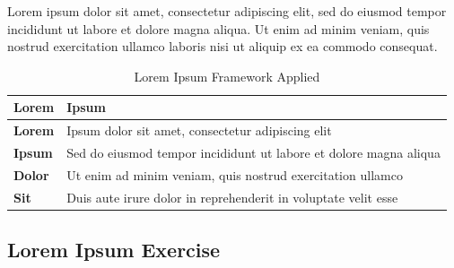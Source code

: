 Lorem ipsum dolor sit amet, consectetur adipiscing elit, sed do eiusmod tempor incididunt ut labore et dolore magna aliqua. Ut enim ad minim veniam, quis nostrud exercitation ullamco laboris nisi ut aliquip ex ea commodo consequat.

\begin{table}[h!]
	\centering
	\begin{tabular}{@{}p{1in}p{3.5in}@{}}
		\toprule
		\textbf{Lorem} & \textbf{Ipsum} \\
		\midrule
		\textbf{Lorem} & Ipsum dolor sit amet, consectetur adipiscing elit \\
		\textbf{Ipsum} & Sed do eiusmod tempor incididunt ut labore et dolore magna aliqua \\
		\textbf{Dolor} & Ut enim ad minim veniam, quis nostrud exercitation ullamco \\
		\textbf{Sit} & Duis aute irure dolor in reprehenderit in voluptate velit esse \\
		\bottomrule
	\end{tabular}
	\caption{Lorem Ipsum Framework Applied}
	\label{tab:lorem_ipsum}
\end{table}




\subsection*{Lorem Ipsum Exercise}

